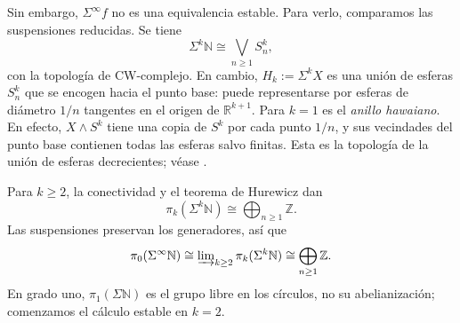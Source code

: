Sin embargo, $\Sigma^\infty f$ no es una equivalencia estable. Para verlo, comparamos las suspensiones reducidas. Se tiene
\[
\Sigma^k\mathbb N\cong\bigvee_{n\ge1}S^k_n,
\]
con la topología de CW-complejo. En cambio, $H_k:=\Sigma^kX$ es una unión de esferas $S^k_n$ que se encogen hacia el punto base: puede representarse por esferas de diámetro $1/n$ tangentes en el origen de $\mathbb R^{k+1}$. Para $k=1$ es el \emph{anillo hawaiano}. En efecto, $X\wedge S^k$ tiene una copia de $S^k$ por cada punto $1/n$, y sus vecindades del punto base contienen todas las esferas salvo finitas. Esta es la topología de la unión de esferas decrecientes; véase \cite[Ejercicio~3.6.24]{malkiewich}.

Para $k\ge2$, la conectividad y el teorema de Hurewicz dan
\[
\pi_k(\Sigma^k\mathbb N)\cong\bigoplus_{n\ge1}\mathbb Z.
\]
Las suspensiones preservan los generadores, así que
\[
\pi_0(\Sigma^\infty\mathbb N)
\cong\varinjlim\nolimits_{k\ge2}\pi_k(\Sigma^k\mathbb N)
\cong\bigoplus_{n\ge1}\mathbb Z.
\]
En grado uno, $\pi_1(\Sigma\mathbb N)$ es el grupo libre en los círculos, no su abelianización; comenzamos el cálculo estable en $k=2$.

